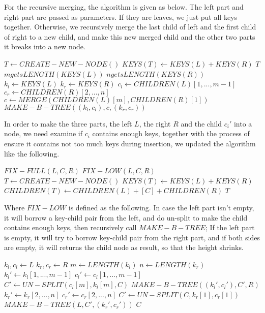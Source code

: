 \documentclass{article}
\begin{document}
For the recursive merging, the algorithm is given as below.
The left part and right part are passed as parameters. If
they are leaves, we just put all keys together. Otherwise,
we recursively merge the last child of left and the first child
of right to a new child, and make this new merged child and
the other two parts it breaks into a new node.

\begin{algorithmic}[1]
    \State $T \gets CREATE-NEW-NODE()$
    \State $KEYS(T) \gets KEYS(L)+KEYS(R)$
    \State \Return $T$
  \Else
    \State $m gets LENGTH(KEYS(L))$
    \State $n gets LENGTH(KEYS(R))$
    \State $k_l \gets KEYS(L)$
    \State $k_r \gets KEYS(R)$
    \State $c_l \gets CHILDREN(L)[1, ..., m-1]$
    \State $c_r \gets CHILDREN(R)[2, ..., n]$
    \State $c \gets MERGE(CHILDREN(L)[m], CHILDREN(R)[1])$
    \State \Return $MAKE-B-TREE((k_l, c_l), c, (k_r, c_r))$
  \EndIf
\EndFunction
\end{algorithmic}

In order to make the three parts, the left $L$, the right $R$ and
the child $c_i'$ into a node, we need examine if $c_i$ contains
enough keys, together with the process of ensure it contains not too
much keys during insertion, we updated the algorithm like the following.

\begin{algorithmic}[1]
    \State \Return $FIX-FULL(L, C, R)$
    \State \Return $FIX-LOW(L, C, R)$
  \Else
    \State $T \leftarrow CREATE-NEW-NODE()$
    \State $KEYS(T) \leftarrow KEYS(L) + KEYS(R)$
    \State $CHILDREN(T) \leftarrow CHILDREN(L)+[C]+CHILDREN(R)$
    \State \Return $T$
  \EndIf
\EndFunction
\end{algorithmic}

Where $FIX-LOW$ is defined as the following. In case the left part
isn't empty, it will borrow a key-child pair from the left, and
do un-split to make the child contains enough keys, then recursively
call $MAKE-B-TREE$; If the left part is empty, it will try to borrow
key-child pair from the right part, and if both sides are empty, it
will returns the child node as result, so that the height shrinks.

\begin{algorithmic}[1]
  \State $k_l, c_l \gets L$
  \State $k_r, c_r \gets R$
  \State $m \gets LENGTH(k_l)$
  \State $n \gets LENGTH(k_r)$
    \State $k_l' \gets k_l[1, ..., m-1]$
    \State $c_l' \gets c_l[1, ..., m-1]$
    \State $C' \gets UN-SPLIT(c_l[m], k_l[m], C)$
    \State \Return $MAKE-B-TREE((k_l', c_l'), C', R)$
    \State $k_r' \gets k_r[2, ..., n]$
    \State $c_r' \gets c_r[2, ..., n]$
    \State $C' \gets UN-SPLIT(C, k_r[1], c_r[1])$
    \State \Return $MAKE-B-TREE(L, C', (k_r', c_r'))$
  \Else
    \State \Return $C$
  \EndIf
\EndFunction
\end{algorithmic}
\end{document}
